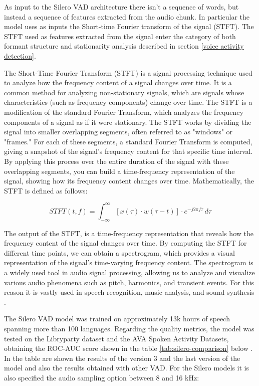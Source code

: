 \documentclass[../main.tex]{subfiles}
\begin{document}
As input to the Silero VAD architecture there isn't a sequence of words, but instead a sequence of features extracted from the audio chunk. In particular the model uses as inputs the Short-time Fourier transform of the signal (STFT). The STFT used as features extracted from the signal enter the category of both formant structure and stationarity analysis described in section \ref{voice activity detection}. 

The Short-Time Fourier Transform (STFT) is a signal processing technique used to analyze how the frequency content of a signal changes over time. It is a common method for analyzing non-stationary signals, which are signals whose characteristics (such as frequency components) change over time. The STFT is a modification of the standard Fourier Transform, which analyzes the frequency components of a signal as if it were stationary. The STFT works by dividing the signal into smaller overlapping segments, often referred to as "windows" or "frames." For each of these segments, a standard Fourier Transform is computed, giving a snapshot of the signal's frequency content for that specific time interval. By applying this process over the entire duration of the signal with these overlapping segments, you can build a time-frequency representation of the signal, showing how its frequency content changes over time. Mathematically, the STFT is defined as follows:

\[ STFT(t, f) = \int_{-\infty}^{\infty} [x(\tau) \cdot w(\tau - t)] \cdot e^{-j2\pi f\tau} \, d\tau \]

The output of the STFT, is a time-frequency representation that reveals how the frequency content of the signal changes over time. By computing the STFT for different time points, we can obtain a spectrogram, which provides a visual representation of the signal's time-varying frequency content. The spectrogram is a widely used tool in audio signal processing, allowing us to analyze and visualize various audio phenomena such as pitch, harmonics, and transient events. For this reason it is vastly used in speech recognition, music analysis, and sound synthesis \cite{stft}.

The Silero VAD model was trained on approximately 13k hours of speech spanning more than 100 languages. Regarding the quality metrics, the model was tested on the Libryparty dataset and the AVA Spoken Activity Datasets, obtaining the ROC-AUC score shown in the table \ref{tab:silero-comparison} below \cite{SileroVAD}. In the table are shown the results of the version 3 and the last version of the model and also the results obtained with other VAD. For the Silero models it is also specified the audio sampling option between 8 and 16 kHz:
\end{document}
